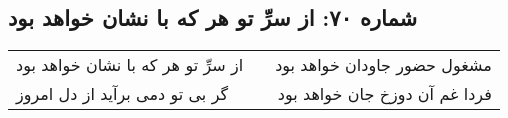 \begin{center}
\section*{شماره ۷۰: از سرِّ تو هر که با نشان خواهد بود}
\label{sec:070}
\begin{longtable}{l p{0.5cm} r}
از سرِّ تو هر که با نشان خواهد بود
&&
مشغول حضور جاودان خواهد بود
\\
گر بی تو دمی برآید از دل امروز
&&
فردا غم آن دوزخ جان خواهد بود
\\
\end{longtable}
\end{center}
